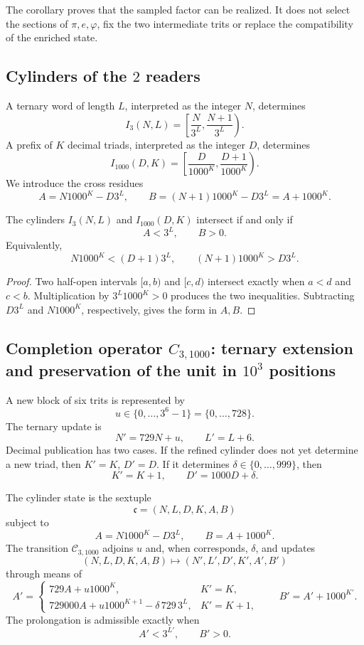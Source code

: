 {The corollary proves that the sampled factor can be realized. It does not select the sections of \(\pi,e,\varphi\), fix the two intermediate trits or replace the compatibility of the enriched state.

\subsection{Cylinders of the \(2\) readers}

A ternary word of length \(L\), interpreted as the integer \(N\),
determines
\[
 I_3(N,L)=\left[\frac{N}{3^L},\frac{N+1}{3^L}\right).
\]
A prefix of \(K\) decimal triads, interpreted as the integer \(D\),
determines
\[
 I_{1000}(D,K)=
 \left[\frac{D}{1000^K},\frac{D+1}{1000^K}\right).
\]
We introduce the cross residues
\[
 A=N1000^K-D3^L,
 \qquad
 B=(N+1)1000^K-D3^L=A+1000^K.
\]

\begin{lemma}
\label{p12-83-c1-s8:lem:u006a-criterio-entero}
The cylinders \(I_3(N,L)\) and \(I_{1000}(D,K)\) intersect if and only if
\[
 \boxed{A<3^L,\qquad B>0.}
\]
Equivalently,
\[
 N1000^K<(D+1)3^L,
 \qquad
 (N+1)1000^K>D3^L.
\]
\end{lemma}

\begin{proof}
Two half-open intervals \([a,b)\) and \([c,d)\) intersect
exactly when \(a<d\) and \(c<b\). Multiplication by
\(3^L1000^K>0\) produces the two inequalities. Subtracting \(D3^L\) and
\(N1000^K\), respectively, gives the form in \(A,B\).
\end{proof}

\subsection{Completion operator \(C_{3,1000}\): ternary extension and preservation of the unit in \(10^3\) positions}

A new block of six trits is represented by
\[
 u\in\{0,\ldots,3^6-1\}=\{0,\ldots,728\}.
\]
The ternary update is
\[
 N'=729N+u,
 \qquad L'=L+6.
\]
Decimal publication has two cases. If the refined cylinder does not yet
determine a new triad, then \(K'=K\), \(D'=D\). If it determines
\(\delta\in\{0,\ldots,999\}\), then
\[
 K'=K+1,
 \qquad D'=1000D+\delta.
\]

\begin{definition}
\label{p12-83-c1-s8:def:u006a-c31000}
The cylinder state is the sextuple
\[
 \mathfrak c=(N,L,D,K,A,B)
\]
subject to
\[
 A=N1000^K-D3^L,
 \qquad B=A+1000^K.
\]
The transition \(\mathcal C_{3,1000}\) adjoins \(u\) and, when corresponds,
\(\delta\), and updates
\[
 (N,L,D,K,A,B)\longmapsto
 (N',L',D',K',A',B')
\]
through means of
\[
 A'=
 \begin{cases}
  729A+u1000^K,&K'=K,\\[1mm]
  729000A+u1000^{K+1}-\delta\,729\,3^L,&K'=K+1,
 \end{cases}
 \qquad
 B'=A'+1000^{K'}.
\]
The prolongation is admissible exactly when
\[
 A'<3^{L'},\qquad B'>0.
\]
\end{definition}

}
